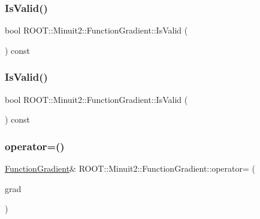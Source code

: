 \subsubsection{\texorpdfstring{IsValid()}{IsValid()}\hspace{0.1cm}{\footnotesize\ttfamily [2/3]}}
{\footnotesize\ttfamily bool R\+O\+O\+T\+::\+Minuit2\+::\+Function\+Gradient\+::\+Is\+Valid (\begin{DoxyParamCaption}{ }\end{DoxyParamCaption}) const\hspace{0.3cm}{\ttfamily [inline]}}

\mbox{\label{classROOT_1_1Minuit2_1_1FunctionGradient_a441801769f9021ade74b724584731791}} 
\subsubsection{\texorpdfstring{IsValid()}{IsValid()}\hspace{0.1cm}{\footnotesize\ttfamily [3/3]}}
{\footnotesize\ttfamily bool R\+O\+O\+T\+::\+Minuit2\+::\+Function\+Gradient\+::\+Is\+Valid (\begin{DoxyParamCaption}{ }\end{DoxyParamCaption}) const\hspace{0.3cm}{\ttfamily [inline]}}

\mbox{\label{classROOT_1_1Minuit2_1_1FunctionGradient_a0b85ff1f65dbefea4c3953898efb06ec}} 
\subsubsection{\texorpdfstring{operator=()}{operator=()}\hspace{0.1cm}{\footnotesize\ttfamily [1/3]}}
{\footnotesize\ttfamily \mbox{\hyperlink{classROOT_1_1Minuit2_1_1FunctionGradient}{Function\+Gradient}}\& R\+O\+O\+T\+::\+Minuit2\+::\+Function\+Gradient\+::operator= (\begin{DoxyParamCaption}\item[{const \mbox{\hyperlink{classROOT_1_1Minuit2_1_1FunctionGradient}{Function\+Gradient}} \&}]{grad }\end{DoxyParamCaption})\hspace{0.3cm}{\ttfamily [inline]}}

